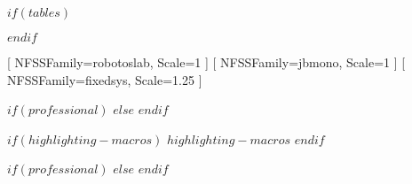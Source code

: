 \usepackage{amssymb}          %
\usepackage{amsmath}          %
\usepackage{hyperref}         %
\usepackage{fontspec}         %
\usepackage[skins]{tcolorbox} %
\usepackage{tikz}             %
\usepackage{calc}             %
\usepackage{beamerbaseframe}
\usepackage{beamerbasemisc}
\usepackage{beamerbasetemplates}

\providecommand{\tightlist}{\setlength{\itemsep}{0pt}\setlength{\parskip}{0pt}}
$if(tables)$
\usepackage{longtable,booktabs,array}
$endif$

[ %
    NFSSFamily=robotoslab,
    Scale=1
]
[ %
    NFSSFamily=jbmono,
    Scale=1
]
[ %
    NFSSFamily=fixedsys,
    Scale=1.25
]

\renewcommand{\rmdefault}{robotoslab}
\renewcommand{\sfdefault}{robotoslab}
\renewcommand{\ttdefault}{jbmono}
\renewcommand{\familydefault}{\sfdefault}

$if(professional)$
$else$
$endif$

$if(highlighting-macros)$
$highlighting-macros$
$endif$


$if(professional)$
$else$
$endif$

